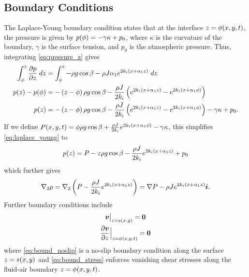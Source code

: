 \subsection{Boundary Conditions}
The Laplace-Young boundary condition states that at the interface $z = \phi\!\left( x, y, t \right)$, the pressure is given by 
$p\!\left( \phi \right) = -\gamma \kappa + p_0$, where $\kappa$ is the curvature of the boundary, $\gamma$ is the surface tension, and $p_0$ is the atmospheric pressure. 
Thus, integrating \cref{eq:pressure_z} gives 
\begin{align}
    \nonumber \int_{\phi}^{z} \frac{\partial p}{\partial z} \; dz &=  \int_{\phi}^{z} -\rho g \cos \beta - \rho J\alpha_1 e^{2k_i \left( x + \alpha_1 z \right)} \; dz\\
    \nonumber p\!\left( z \right) - p\!\left( \phi \right) &= -\left( z - \phi \right) \rho g \cos \beta - \frac{\rho J}{2k_i} \left( e^{2k_i \left( x + \alpha_1 z \right)} - e^{2k_i \left( x + \alpha_1 \phi \right)} \right)\\
    p\!\left( z \right) &= -\left( z - \phi \right)\rho g \cos \beta - \frac{\rho J}{2k_i} \left( e^{2k_i \left( x + \alpha_1 z \right)} - e^{2k_i \left( x + \alpha_1 \phi \right)} \right) -\gamma \kappa + p_0.  
    \label{eq:laplace_young}
\end{align}
If we define 
    $P\!\left( x, y, t \right) = \phi \rho g \cos\beta + \frac{\rho J}{2k_i} e^{2k_i \left( x + \alpha_1 \phi \right)} - \gamma\kappa$, 
this simplifies \cref{eq:laplace_young} to 
\begin{align*}
    p\!\left( z \right) = P - z\rho g \cos\beta - \frac{\rho J}{2k_i}e^{2k_i \left( x + \alpha_1 z \right)} + p_0
\end{align*}
which further gives 
\begin{align}
    \grad_2 p %
    = \grad_2 \lrp{P - \frac{\rho J}{2k_i}\cexpz}
    = \grad P - \rho J\cexpz \vect{i}. 
    \label{eq:grad2_p_expanded}
\end{align}
Further boundary conditions include 
\begin{gather}
    \evalat{\vect{v}}{z = s\lrp{x,y}} = \vect{0} 
    \label{eq:bound_noslip}\\
    \evalat[\Big]{\pderiv{\vect{v}}{z}}{z = \phi\lrp{x,y,t}} = \vect{0} 
    \label{eq:bound_stress}
\end{gather}
where \cref{eq:bound_noslip} is a no-slip boundary condition along the surface $z = s\!\left( x,y \right)$ and \cref{eq:bound_stress}
enforces vanishing shear stresses along the fluid-air boundary $z = \phi\!\left( x,y,t \right)$. 

